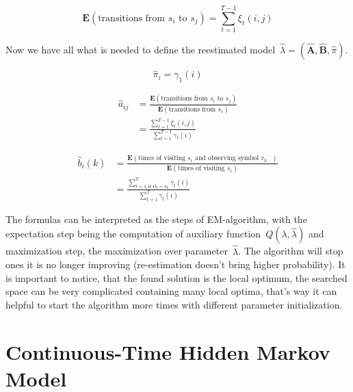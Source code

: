 \documentclass[thesis=M,english]{FITthesis}[2012/10/20]
\newcommand{\matr}[1]{\mathbf{#1}}
\begin{document}
\begin{equation}
\mathbf{E}(\text{transitions from $s_i$ to $s_j$}) = \sum_{t=1}^{T-1} \xi_t(i,j)  
\end{equation}

Now we have all what is needed to define the reestimated model~$\hat\lambda=(\hat{\matr{A}},\hat{\matr{B}},\hat\pi)$.

\begin{equation}\label{eq:bwpi}
\hat\pi_i = \gamma_1(i)  
\end{equation}

\begin{equation}\label{eq:bwa}
\begin{aligned}
\hat a_{ij} &= \frac{\mathbf{E}(\text{transitions from $s_i$ to $s_j$})}
				   {\mathbf{E}(\text{transitions from $s_i$})}  \\
		    &= \frac{\sum\limits_{t=1}^{T-1} \xi_t(i,j)}{\sum\limits_{t=1}^{T-1} \gamma_t(i) }
\end{aligned}
\end{equation}

\begin{equation}\label{eq:bwb}
\begin{aligned}
\hat b_{i}(k) &= \frac{\mathbf{E}(\text{times of visiting $s_i$ and observing symbol $v_k$ })}
				   {\mathbf{E}(\text{times of visiting $s_i$})} \\
			  &= \frac{\sum\limits_{t=1, \text{if } O_t = v_k  }^{T} \gamma_t(i)}{\sum\limits_{t=1}^{T} \gamma_t(i) } 
\end{aligned}
\end{equation}


The formulas can be interpreted as the steps of EM-algorithm, with the expectation step being the computation of auxiliary function~$Q(\lambda,\hat\lambda)$ and maximization step, the maximization over parameter~$\hat\lambda$. The algorithm will stop ones it is no longer improving (re-estimation doesn't bring higher probability). It is important to notice, that the found solution is the local optimum, the searched space can be very complicated containing many local optima, that's way it can helpful to start the algorithm more times with different parameter initialization.  


\chapter{Continuous-Time Hidden Markov Model}
\end{document}
